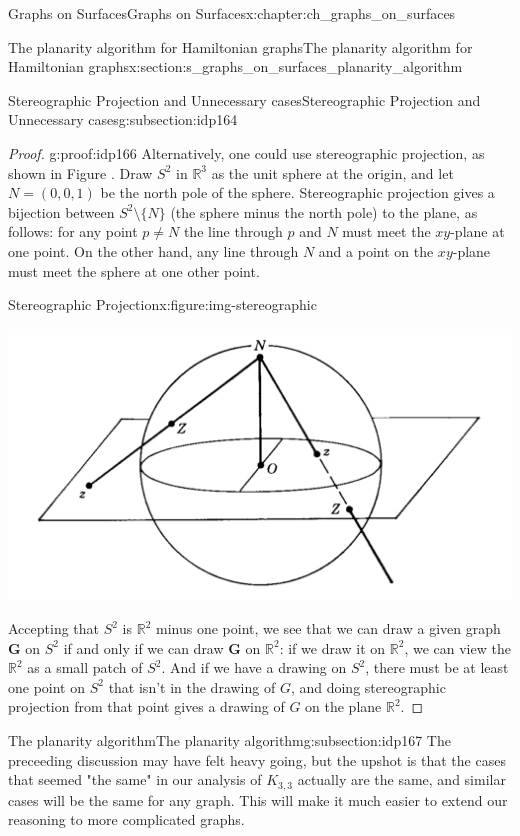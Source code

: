 \documentclass[oneside,10pt,]{book}
\numberwithin{equation}{section}
\newcommand{\reals}{\mathbb{R}}
\newcommand{\bfG}{\mathbf{G}}
\begin{document}
\begin{chapterptx}{Graphs on Surfaces}{}{Graphs on Surfaces}{}{}{x:chapter:ch_graphs_on_surfaces}
\begin{sectionptx}{The planarity algorithm for Hamiltonian graphs}{}{The planarity algorithm for Hamiltonian graphs}{}{}{x:section:s_graphs_on_surfaces_planarity_algorithm}
\begin{subsectionptx}{Stereographic Projection and Unnecessary cases}{}{Stereographic Projection and Unnecessary cases}{}{}{g:subsection:idp164}
\begin{proof}{}{g:proof:idp166}
Alternatively, one could use stereographic projection, as shown in Figure .  Draw \(S^2\) in \(\reals^3\) as the unit sphere at the origin, and let \(N=(0,0,1)\) be the north pole of the sphere.  Stereographic projection gives a bijection between \(S^2\setminus\{N\}\) (the sphere minus the north pole) to the plane, as follows: for any point \(p\neq N\) the line through \(p\) and \(N\) must meet the \(xy\)-plane at one point.  On the other hand, any line through \(N\) and a point on the \(xy\)-plane must meet the sphere at one other point.%
\begin{figureptx}{Stereographic Projection}{x:figure:img-stereographic}{}%
\begin{image}{0.05}{0.9}{0.05}%
\includegraphics[width=\linewidth]{images/stereographic.jpg}
\end{image}%
\tcblower
\end{figureptx}%
Accepting that \(S^2\) is \(\reals^2\) minus one point, we see that we can draw a given graph \(\bfG\) on \(S^2\) if and only if we can draw \(\bfG\) on \(\reals^2\): if we draw it on \(\reals^2\), we can view the \(\reals^2\) as a small patch of \(S^2\). And if we have a drawing on \(S^2\), there must be at least one point on \(S^2\) that isn't in the drawing of \(G\), and doing stereographic projection from that point gives a drawing of \(G\) on the plane \(\reals^2\).%
\end{proof}
\end{subsectionptx}
%
%
\typeout{************************************************}
\typeout{************************************************}
%
\begin{subsectionptx}{The planarity algorithm}{}{The planarity algorithm}{}{}{g:subsection:idp167}
The preceeding discussion may have felt heavy going, but the upshot is that the cases that seemed "the same" in our analysis of \(K_{3,3}\) actually are the same, and similar cases will be the same for any graph. This will make it much easier to extend our reasoning to more complicated graphs.%

\end{subsectionptx}
\end{sectionptx}
\end{chapterptx}
\end{document}
